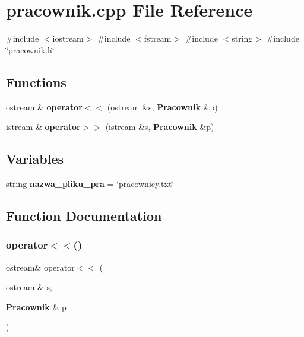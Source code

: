 \section{pracownik.\+cpp File Reference}
\label{pracownik_8cpp}
{\ttfamily \#include $<$iostream$>$}\newline
{\ttfamily \#include $<$fstream$>$}\newline
{\ttfamily \#include $<$string$>$}\newline
{\ttfamily \#include \char`\"{}pracownik.\+h\char`\"{}}\newline
\subsection*{Functions}
\begin{DoxyCompactItemize}
\item 
ostream \& \textbf{ operator$<$$<$} (ostream \&s, \textbf{ Pracownik} \&p)
\item 
istream \& \textbf{ operator$>$$>$} (istream \&s, \textbf{ Pracownik} \&p)
\end{DoxyCompactItemize}
\subsection*{Variables}
\begin{DoxyCompactItemize}
\item 
string \textbf{ nazwa\+\_\+pliku\+\_\+pra} = \char`\"{}pracownicy.\+txt\char`\"{}
\end{DoxyCompactItemize}


\subsection{Function Documentation}
\mbox{\label{pracownik_8cpp_a178bdb8fdeb19bc53a50422983104895}} 
\subsubsection{operator$<$$<$()}
{\footnotesize\ttfamily ostream\& operator$<$$<$ (\begin{DoxyParamCaption}\item[{ostream \&}]{s,  }\item[{\textbf{ Pracownik} \&}]{p }\end{DoxyParamCaption})}

